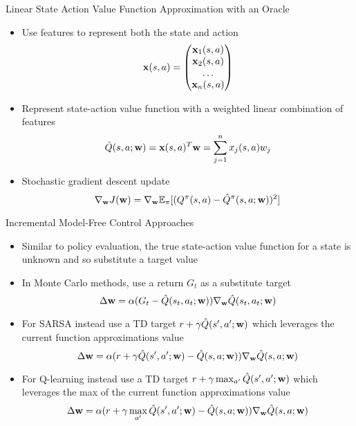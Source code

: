 \documentclass[aspectratio=169]{../latex_main/tntbeamer}  %
\begin{document}
\begin{frame}[c]{Linear State Action Value Function Approximation with an Oracle}

	\begin{itemize}
		\item Use features to represent both the state and action
		$$\mathbf{x}(s,a) = \begin{pmatrix}
			\mathbf{x}_1(s,a)\\
			\mathbf{x}_2(s,a)\\
			\ldots\\
			\mathbf{x}_n(s,a)
		\end{pmatrix} $$
		\item Represent state-action value function with a weighted linear
		combination of features
		$$\hat{Q}(s,a;\mathbf{w}) = \mathbf{x}(s,a)^T \mathbf{w} = \sum_{j=1}^n x_j(s,a)w_j $$
		\item Stochastic gradient descent update
		$$\nabla_{\mathbf{w}} J(\mathbf{w}) = \nabla_{\mathbf{w}} \mathbb{E}_\pi [(Q^\pi(s,a) - \hat{Q}^\pi(s,a;\mathbf{w}))^2] $$
	\end{itemize}

\end{frame}
\begin{frame}[c]{Incremental Model-Free Control Approaches}

	\begin{itemize}
		\item Similar to policy evaluation, the true state-action value function for a state is unknown and so substitute a target value
		\item In Monte Carlo methods, use a return $G_t$ as a substitute target
		$$\Delta \mathbf{w} = \alpha(G_t - \hat{Q}(s_t,a_t; \mathbf{w})) \nabla_{\mathbf{w}} \hat{Q}(s_t, a_t; \mathbf{w}) $$
        \pause
		\item For SARSA instead use a TD target $r+ \gamma \hat{Q}(s', a'; \mathbf{w})$ which leverages the current function approximations value
		$$\Delta \mathbf{w} = \alpha (r + \gamma \hat{Q}(s',a';\mathbf{w}) - \hat{Q}(s,a;\mathbf{w})) \nabla_{\mathbf{w}}\hat{Q}(s,a;\mathbf{w}) $$
        \pause
		\item For Q-learning instead use a TD target $r + \gamma \max_{a'} \hat{Q}(s',a';\mathbf{w})$ which leverages the max of the current function approximations value
		$$\Delta \mathbf{w} = \alpha (r + \gamma \max_{a'} \hat{Q}(s',a';\mathbf{w}) - \hat{Q}(s,a;\mathbf{w})) \nabla_{\mathbf{w}}\hat{Q}(s,a;\mathbf{w}) $$
	\end{itemize}

\end{frame}
\end{document}
